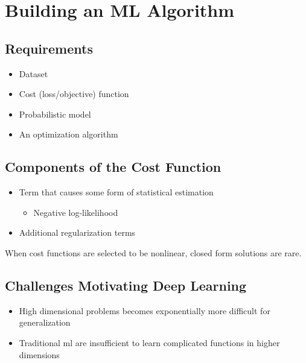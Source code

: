 \documentclass[../Main.tex]{subfiles}
\begin{document}
\section{Building an ML Algorithm}

\subsection{Requirements}
\begin{itemize}
    \item Dataset
    \item Cost (loss/objective) function
    \item Probabilistic model
    \item An optimization algorithm
\end{itemize}

\subsection{Components of the Cost Function}
\begin{itemize}
    \item Term that causes some form of statistical estimation
        \begin{itemize}
            \item Negative log-likelihood
        \end{itemize}
    \item Additional regularization terms
\end{itemize}
When cost functions are selected to be nonlinear, closed form solutions are rare.

\subsection{Challenges Motivating Deep Learning}
\begin{itemize}
    \item High dimensional problems becomes exponentially more difficult for generalization
    \item Traditional ml are insufficient to learn complicated functions in higher dimensions
\end{itemize}

\end{document}
